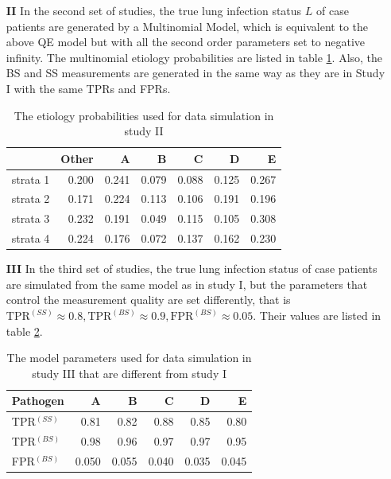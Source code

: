 \documentclass[11 pt, a4paper]{article}  %
\begin{document}
\begin{itemize}
\item[{\bf II}]
In the second set of studies, the true lung infection status $L$ of case patients are generated by a Multinomial Model, which is equivalent to the above QE model but with all the second order parameters set to negative infinity. The multinomial etiology probabilities are listed in table \ref{tab:study2}. Also, the BS and SS measurements are generated in the same way as they are in Study I with the same TPRs and FPRs.

\begin{table}[h]
\centering
\caption{The etiology probabilities used for data simulation in study II}
\label{tab:study2}
\begin{tabular}{lrrrrrr}
\hline
         & Other & A     & B     & C     & D     & E     \\ \hline
strata 1 & 0.200 & 0.241 & 0.079 & 0.088 & 0.125 & 0.267 \\
strata 2 & 0.171 & 0.224 & 0.113 & 0.106 & 0.191 & 0.196 \\
strata 3 & 0.232 & 0.191 & 0.049 & 0.115 & 0.105 & 0.308 \\
strata 4 & 0.224 & 0.176 & 0.072 & 0.137 & 0.162 & 0.230 \\ \hline
\end{tabular}
\end{table}

\item[{\bf III}]
In the third set of studies, the true lung infection status of case patients are simulated from the same model as in study I, but the parameters that control the measurement quality are set differently, that is $\text{TPR}^{(SS)} \approx 0.8,  \text{TPR}^{(BS)} \approx 0.9, \text{FPR}^{(BS)} \approx 0.05$. Their values are listed in table \ref{tab:study3}.\\

\begin{table}[h]
\centering
\caption{The model parameters used for data simulation in study III that are different from study I}
\label{tab:study3}
\begin{tabular}{lrrrrr}
\hline
Pathogen     & A    & B     & C     & D     & E    \\ \hline
TPR$^{(SS)}$ & 0.81 & 0.82  & 0.88  & 0.85  & 0.80 \\
TPR$^{(BS)}$ & 0.98 & 0.96  & 0.97  & 0.97  & 0.95 \\
FPR$^{(BS)}$ & 0.050 & 0.055  & 0.040  & 0.035  & 0.045 \\ \hline
\end{tabular}
\end{table}

\end{itemize}
\end{document}
